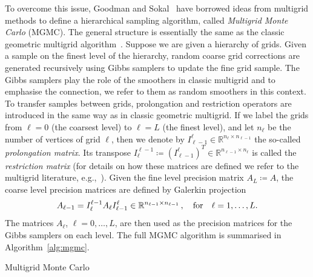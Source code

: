 \documentclass[
fontsize=11pt,
paper=a4,
numbers=noenddot
]{scrartcl}
\begin{document}
To overcome this issue, Goodman and Sokal~\cite{goodmansokal} have borrowed ideas from multigrid methods to define a hierarchical sampling algorithm, called \emph{Multigrid Monte Carlo} (MGMC). The general structure is essentially the same as the classic geometric multigrid algorithm~\cite{hackbuschMultiGridMethodsApplications1985}. Suppose we are given a hierarchy of grids. Given a sample on the finest level of the hierarchy, random coarse grid corrections are generated recursively using Gibbs samplers to update the fine grid sample. The Gibbs samplers play the role of the smoothers in classic multigrid and to emphasise the connection, we refer to them as random smoothers in this context. To transfer samples between grids, prolongation and restriction operators are introduced in the same way as in classic  geometric multigrid. If we label the grids from $\ell = 0$ (the coarsest level) to $\ell = L$ (the finest level), and let $n_\ell$ be the number of vertices of grid $\ell$, then we denote by $I_{\ell-1}^\ell \in \mathbb{R}^{n_\ell \times n_{\ell - 1}}$ the so-called \emph{prolongation matrix}. Its transpose $I_{\ell}^{\ell-1} \coloneqq {(I_{\ell-1}^\ell)}^T \in \mathbb{R}^{n_{\ell - 1} \times n_{\ell}}$ is called the \emph{restriction matrix} (for details on how these matrices are defined we refer to the multigrid literature, e.g.,~\cite{hackbuschMultiGridMethodsApplications1985}). Given the fine level precision matrix $A_L \coloneqq A$, the coarse level precision matrices are defined by Galerkin projection
\begin{equation}
  \label{eq:galerkin}
    A_{\ell-1} = I_\ell^{\ell - 1} A_\ell I_{\ell-1}^\ell \in \mathbb{R}^{n_{\ell-1} \times n_{\ell-1}}\,, \quad \text{for\quad$\ell = 1, \dotsc, L$.}
\end{equation}
The matrices $A_\ell$, $\ell = 0, \dotsc, L$, are then used as the precision matrices for the Gibbs samplers on each level. The full MGMC algorithm is summarised in Algorithm~\ref{alg:mgmc}.

\begin{algorithm}
    \DontPrintSemicolon



    \SetAlgoLined

    \caption{Multigrid Monte Carlo}\label{alg:mgmc}
\end{algorithm}
\end{document}
